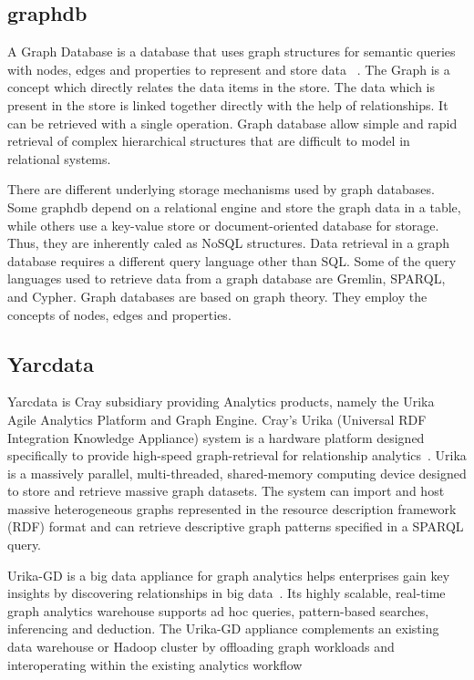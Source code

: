      \pv

     
\subsection{graphdb}

A Graph Database is a database that uses graph structures for semantic
queries with nodes, edges and properties to represent and store data
~\cite{www-graphdb}. The Graph is a concept which directly relates the
data items in the store.  The data which is present in the store is
linked together directly with the help of relationships. It can be
retrieved with a single operation.  Graph database allow simple and
rapid retrieval of complex hierarchical structures that are difficult
to model in relational systems.

     There are different underlying storage mechanisms used by graph
     databases.  Some graphdb depend on a relational engine and store
     the graph data in a table, while others use a key-value store or
     document-oriented database for storage. Thus, they are inherently
     caled as NoSQL structures.  Data retrieval in a graph database
     requires a different query language other than SQL. Some of the
     query languages used to retrieve data from a graph database are
     Gremlin, SPARQL, and Cypher.  Graph databases are based on graph
     theory. They employ the concepts of nodes, edges and properties.

     \pv
     
\subsection{Yarcdata \cv}

Yarcdata is Cray subsidiary providing Analytics products, namely the
Urika Agile Analytics Platform and Graph Engine. Cray's Urika
(Universal RDF Integration Knowledge Appliance) system is a hardware
platform designed specifically to provide high-speed graph-retrieval
for relationship analytics~\cite{www-Urika-appliance}.  Urika is a
massively parallel, multi-threaded, shared-memory computing device
designed to store and retrieve massive graph datasets. The system can
import and host massive heterogeneous graphs represented in the
resource description framework (RDF) format and can retrieve
descriptive graph patterns specified in a SPARQL query.

Urika-GD is a big data appliance for graph analytics helps enterprises
gain key insights by discovering relationships in big
data~\cite{techspec-Urika-GD}.  Its highly scalable, real-time graph
analytics warehouse supports ad hoc queries, pattern-based searches,
inferencing and deduction. The Urika-GD appliance complements an
existing data warehouse or Hadoop cluster by offloading graph
workloads and interoperating within the existing analytics workflow

